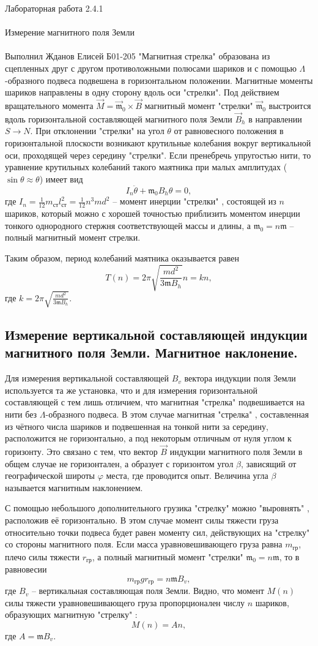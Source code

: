 \documentclass{astroedu-lab}
\begin{document}
\begin{problem}{\huge Лабораторная работа 2.4.1\\\\Измерение магнитного поля Земли\\\\Выполнил Жданов Елисей Б01-205}
"Магнитная стрелка" образована из сцепленных друг с другом противоложными полюсами шариков и с помощью $\Lambda$-образного подвеса подвешена в горизонтальном положении. Магнитные моменты шариков направлены в одну сторону вдоль оси "стрелки". Под действием вращательного момента $\vec{M}=\vec{\mathfrak{m}}_0\times\vec{B}$ магнитный момент "стрелки" $\vec{\mathfrak{m}}_0$ выстроится вдоль горизонтальной составляющей магнитного поля Земли $\vec{B}_h$ в направлении $S\to N$. При отклонении "стрелки" на угол $\theta$ от равновесного положения в горизонтальной плоскости возникают крутильные колебания вокруг вертикальной оси, проходящей через середину "стрелки". Если пренебречь упругостью нити, то уравнение крутильных колебаний такого маятника при малых амплитудах ($\sin{\theta}\approx\theta$) имеет вид\[I_n\ddot{\theta}+\mathfrak{m}_0B_h\theta=0,\]где $I_n=\frac{1}{12}m_{\text{ст}}l_{\text{ст}}^2=\frac{1}{12}n^3md^2$ -- момент инерции "стрелки" , состоящей из $n$ шариков, который можно с хорошей точностью приблизить моментом инерции тонкого однородного стержня соответствующей массы и длины, а $\mathfrak{m}_0=n\mathfrak{m}$ -- полный магнитный момент стрелки.

Таким образом, период колебаний маятника оказывается равен\[T(n)=2\pi\sqrt{\frac{md^2}{3\mathfrak{m}B_h}}n=kn,\]где $k=2\pi\sqrt{\frac{md^2}{3\mathfrak{m}B_h}}$.

\subsection{Измерение вертикальной составляющей индукции магнитного поля Земли. Магнитное наклонение.}

Для измерения вертикальной составляющей $B_v$ вектора индукции поля Земли используется та же установка, что и для измерения горизонтальной составляющей с тем лишь отличием, что магнитная "стрелка" подвешивается на нити без $\Lambda$-образного подвеса. В этом случае магнитная "стрелка" , составленная из чётного числа шариков и подвешенная на тонкой нити за середину, расположится не горизонтально, а под некоторым отличным от нуля углом к горизонту. Это связано с тем, что вектор $\vec{B}$ индукции магнитного поля Земли в общем случае не горизонтален, а образует с горизонтом угол $\beta$, зависящий от географической широты $\varphi$ места, где проводится опыт. Величина угла $\beta$ называется магнитным наклонением.

С помощью небольшого дополнительного грузика "стрелку" можно "выровнять" , расположив её горизонтально. В этом случае момент силы тяжести груза относительно точки подвеса будет равен моменту сил, действующих на "стрелку" со стороны магнитного поля. Если масса уравновешивающего груза равна $m_{\text{гр}}$, плечо силы тяжести $r_{\text{гр}}$, а полный магнитный момент "стрелки" $\mathfrak{m}_0=n\mathfrak{m}$, то в равновесии\[m_{\text{гр}}gr_{\text{гр}}=n\mathfrak{m}B_v,\]где $B_v$ -- вертикальная составляющая поля Земли. Видно, что момент $M(n)$ силы тяжести уравновешивающего груза пропорционален числу $n$ шариков, образующих магнитную "стрелку" :\[M(n)=An,\]где $A=\mathfrak{m}B_v$.


\end{problem}
\end{document}
